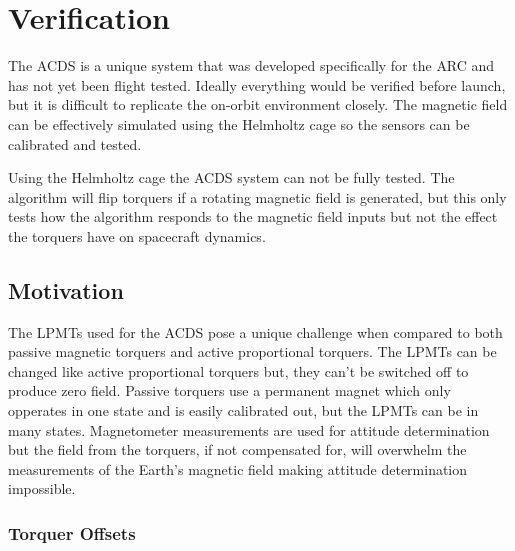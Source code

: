 
\chapter{Verification}

\label{ch:Verification}

The \ac{ACDS} is a unique system that was developed specifically for the \ac{ARC} and has not yet been flight tested. Ideally everything would be verified before launch, but it is difficult to replicate the on-orbit environment closely. The magnetic field can be effectively simulated using the Helmholtz cage so the sensors can be calibrated and tested. 

Using the Helmholtz cage the \ac{ACDS} system can not be fully tested. The algorithm will flip torquers if a rotating magnetic field is generated, but this only tests how the algorithm responds to the magnetic field inputs but not the effect the torquers have on spacecraft dynamics.

\section{Motivation}

The \acp{LPMT} used for the \ac{ACDS} pose a unique challenge when compared to both passive magnetic torquers and active proportional torquers. The \acp{LPMT} can be changed like active proportional torquers but, they can't be switched off to produce zero field. Passive torquers use a permanent magnet which only opperates in one state and is easily calibrated out, but the \acp{LPMT} can be in many states. Magnetometer measurements are used for attitude determination but the field from the torquers, if not compensated for, will overwhelm the measurements of the Earth's magnetic field making attitude determination impossible.

\subsection{Torquer Offsets}





